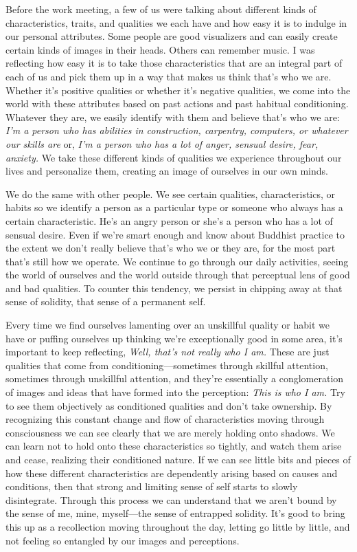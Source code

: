 
Before the work meeting, a few of us were talking about different kinds 
of characteristics, traits, and qualities we each have and how easy it 
is to indulge in our personal attributes. Some people are good 
visualizers and can easily create certain kinds of images in their 
heads. Others can remember music. I was reflecting how easy it is to 
take those characteristics that are an integral part of each of us and 
pick them up in a way that makes us think that's who we are. Whether 
it's positive qualities or whether it's negative qualities, we come 
into the world with these attributes based on past actions and past 
habitual conditioning. Whatever they are, we easily identify with them 
and believe that's who we are: \emph{I'm a person who has abilities in 
construction, carpentry, computers, or whatever our skills are} or, 
\emph{I'm a person who has a lot of anger, sensual desire, fear, 
anxiety.} We take these different kinds of qualities we experience 
throughout our lives and personalize them, creating an image of 
ourselves in our own minds.

We do the same with other people. We see certain qualities, 
characteristics, or habits so we identify a person as a particular type 
or someone who always has a certain characteristic. He's an angry 
person or she's a person who has a lot of sensual desire. Even if we're 
smart enough and know about Buddhist practice to the extent we don't 
really believe that's who we or they are, for the most part that's 
still how we operate. We continue to go through our daily activities, 
seeing the world of ourselves and the world outside through that 
perceptual lens of good and bad qualities. To counter this tendency, we 
persist in chipping away at that sense of solidity, that sense of a 
permanent self.

Every time we find ourselves lamenting over an unskillful quality or 
habit we have or puffing ourselves up thinking we're exceptionally good 
in some area, it's important to keep reflecting, \emph{Well, that's not 
really who I am.} These are just qualities that come from 
conditioning---sometimes through skillful attention, sometimes through 
unskillful attention, and they're essentially a conglomeration of 
images and ideas that have formed into the perception: \emph{This is 
who I am.} Try to see them objectively as conditioned qualities and 
don't take ownership. By recognizing this constant change and flow of 
characteristics moving through consciousness we can see clearly that we 
are merely holding onto shadows. We can learn not to hold onto these 
characteristics so tightly, and watch them arise and cease, realizing 
their conditioned nature. If we can see little bits and pieces of how 
these different characteristics are dependently arising based on causes 
and conditions, then that strong and limiting sense of self starts to 
slowly disintegrate. Through this process we can understand that we 
aren't bound by the sense of me, mine, myself---the sense of entrapped 
solidity. It's good to bring this up as a recollection moving 
throughout the day, letting go little by little, and not feeling so 
entangled by our images and perceptions.

